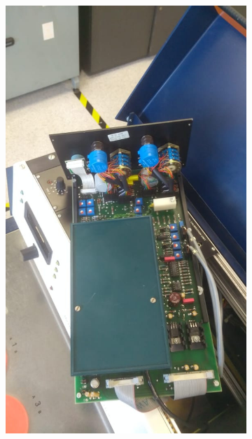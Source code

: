 \begin{figure}[h]
\begin{subfigure}{0.24\linewidth}
			\includegraphics[width=\linewidth]{Figures/process/p3}
			\caption{ }
			\label{fig: subE}
		\end{subfigure}
		\begin{subfigure}{0.24\linewidth}

\end{subfigure}
\end{figure}
